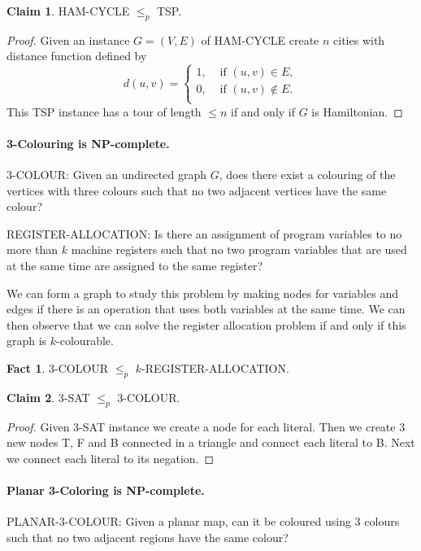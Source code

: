 \documentclass[11pt,a4paper]{article}
\theoremstyle{definition}
\newtheorem{claim}{Claim}
\newtheorem*{fact}{Fact}
\begin{document}
\begin{claim}
HAM-CYCLE $\le_p$ TSP.
\end{claim}
\begin{proof}
Given an instance $G= (V,E)$ of HAM-CYCLE create $n$ cities with distance function defined by
\[
d(u,v) =\begin{cases}
1, &\text{ if } (u,v) \in E,\\
0, &\text{ if } (u,v) \not\in E.\\
\end{cases} 
\]
This TSP instance has a tour of length $\le n$ if and only if $G$ is Hamiltonian.
\end{proof}

\paragraph{3-Colouring is NP-complete.}
3-COLOUR: Given an undirected graph $G$, does there exist a colouring of the vertices with three colours such that no two adjacent vertices have the same colour?

REGISTER-ALLOCATION: Is there an assignment of program variables to no more than $k$ machine registers such that no two program variables that are used at the same time are assigned to the same register?

We can form a graph to study this problem by making nodes for variables and edges if there is an operation that uses both variables at the same time.
We can then observe that we can solve the register allocation problem if and only if this graph is $k$-colourable.

\begin{fact}
3-COLOUR $\le_p$ $k$-REGISTER-ALLOCATION.
\end{fact}

\begin{claim}
3-SAT $\le_p$ 3-COLOUR.
\end{claim}
\begin{proof}
Given 3-SAT instance we create a node for each literal.
Then we create 3 new nodes T, F and B connected in a triangle and connect each literal to B.
Next we connect each literal to its negation.
\end{proof}

\paragraph{Planar 3-Coloring is NP-complete.}
PLANAR-3-COLOUR: Given a planar map, can it be coloured using 3 colours such that no two adjacent regions have the same colour?
\end{document}
